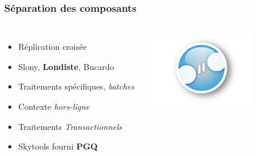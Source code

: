 \documentclass[english]{beamer}
\begin{document}
\begin{frame}[fragile]
  \frametitle{Séparation des composants}

  \linebreak

\begin{columns}[c]

  \begin{itemize}
   \item<1-> Réplication croisée
   \item<2-> Slony, \textbf{Londiste}, Bucardo
   \item<3-> Traitements spécifiques, \textit{batches}
   \item<3-> Contexte \textit{hors-ligne}
   \item<3-> Traitements \textit{Transactionnels}
   \item<4-> Skytools fourni \alert{\textbf{PGQ}}
  \end{itemize}  

\includegraphics[height=9em]{cross-replication.jpg}
\end{columns}
\end{frame}

\end{document}
